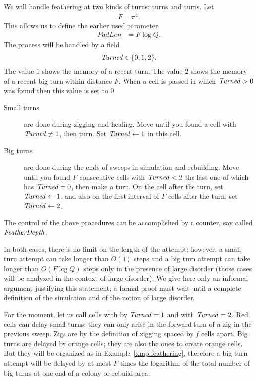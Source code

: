 \documentclass[11pt]{memoir}
\theoremstyle{definition} %
\newcommand{\fld}[1]{\ensuremath{\textit{#1\/}}}
\newcommand{\f}{f}
\newcommand{\F}{F}
\newcommand{\passno}{\pi}
\newcommand{\Q}{Q}
\newcommand{\Turned}{\fld{Turned}}
\newcommand{\FDepth}{\fld{FeatherDepth}}
\newcommand{\PadLen}{\mathit{PadLen}}
\begin{document}
We will handle feathering at two kinds of turns:  turns and  turns.
Let 
\begin{align}\label{eq:FDef}
  \F = \passno^{4}.
 \end{align}
 This allows us to define the earlier used parameter
\begin{align}\label{eq:PadLenDef}
  \PadLen &= \F\log\Q.   
 \end{align}
The process will be handled by a field 
\begin{align*}
   \Turned\in\{ 0,1,2 \}.
\end{align*}
The value \( 1 \) shows the memory of a recent turn.
The value \( 2 \) shows the memory of a recent big turn within distance \( \F \).
When a cell is passed in which \( \Turned>0 \) was found then this value is set to \( 0 \).
\begin{description}
\item[Small turns]
are done during zigging and healing.
Move until you found a cell with \( \Turned\ne 1 \), then turn.
Set \( \Turned\gets 1 \) in this cell.

\item[Big turns] are done during the ends of sweeps in simulation and rebuilding.
Move until you found \( \F \) consecutive cells with \( \Turned<2 \)
the last one of which has \( \Turned=0 \), then make a turn.
On the cell after the turn, set \( \Turned\gets 1 \),
and also on the first interval of  \( \F \) cells after the turn, set \( \Turned\gets 2 \).
\end{description}
The control of the above procedures can be accomplished by a counter, say
called \( \FDepth \).

In both cases, there is no limit on the length of the attempt; however, 
a small turn attempt can take longer than \( O(1) \) steps and
a big turn attempt can take longer than \( O(\F\log\Q) \) steps only in the presence of
large disorder (those cases will be analyzed in the context of large disorder).
We give here only an informal argument justifying this statement; a
formal proof must wait until 
a complete definition of the simulation and of the notion of large disorder.

For the moment, let us call cells   with by \( \Turned=1 \)
and  with \( \Turned=2 \).
Red cells can delay small turns;
they can only arise in the forward turn of a zig in the previous sweep.
Zigs are by the definition of zigging spaced by \( \f \) cells apart.
Big turns are delayed by orange cells; they are also the ones to create orange cells.
But they will be organized as in Example~\ref{xmp:feathering},
therefore a big turn attempt will be delayed by at most \( \F \) times the logarithm
of the total number of big turns at one end of a colony or rebuild area.
\end{document}
